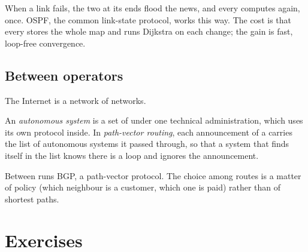  When a link fails, the two  at its ends flood the news, and every 
computes again, once. OSPF, the common link-state protocol, works this way. The cost is that every  stores the
whole map and runs Dijkstra on each change; the gain is fast, loop-free convergence.


\subsection{Between operators}

The Internet is a network of networks.

\begin{definition}\label{def:b2:network-layer:as}
An \emph{autonomous system} is a set of  under one technical administration, which
uses its own  protocol inside. In \emph{path-vector routing}, each announcement of a
 carries the list of autonomous systems it passed through, so that a system that finds itself in the list knows
there is a loop and ignores the announcement.
\end{definition}

Between  runs BGP, a path-vector protocol. The choice among
routes is a matter of policy (which neighbour is a customer, which one is paid) rather than of shortest paths.


\section{Exercises}\label{sec:b2:network-layer:exercises}

